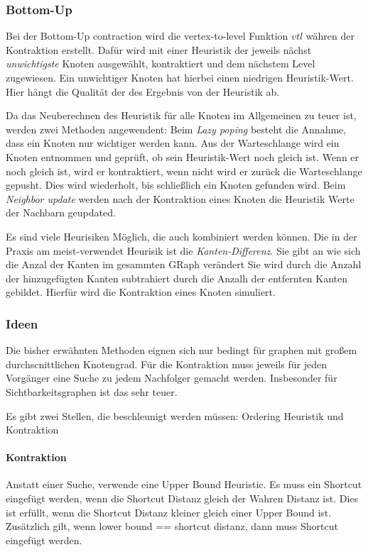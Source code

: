 \subsubsection{Bottom-Up}

Bei der Bottom-Up contraction wird die vertex-to-level Funktion ${vtl}$ währen der Kontraktion erstellt.
Dafür wird mit einer Heuristik der jeweils nächst \emph{unwichtigste} Knoten ausgewählt, kontraktiert und dem nächstem Level zugewiesen.
Ein unwichtiger Knoten hat hierbei einen niedrigen Heuristik-Wert.
Hier hängt die Qualität der des Ergebnis von der Heuristik ab.

Da das Neuberechnen des Heuristik für alle Knoten im Allgemeinen zu teuer ist, werden zwei Methoden angewendent:
Beim \emph{Lazy poping} besteht die Annahme, dass ein Knoten nur wichtiger werden kann.
Aus der Warteschlange wird ein Knoten entnommen und geprüft, ob sein Heuristik-Wert noch gleich ist.
Wenn er noch gleich ist, wird er kontraktiert, wenn nicht wird er zurück die Warteschlange gepusht.
Dies wird wiederholt, bis schließlich ein Knoten gefunden wird.
Beim \emph{Neighbor update} werden nach der Kontraktion eines Knoten die Heuristik Werte der Nachbarn geupdated.

Es sind viele Heurisiken Möglich, die auch kombiniert werden können.
Die in der Praxis am meist-verwendet Heurisik ist die \emph{Kanten-Differenz}.
Sie gibt an wie sich die Anzal der Kanten im gesammten GRaph verändert
Sie wird durch die Anzahl der hinzugefügten Kanten subtrahiert durch die Anzalh der entfernten Kanten gebildet.
Hierfür wird die Kontraktion eines Knoten simuliert.

\subsubsection{Ideen}

Die bisher erwähnten Methoden eignen sich nur bedingt für graphen mit großem durchscnittlichen Knotengrad.
Für die Kontraktion muss jeweils für jeden Vorgänger eine Suche zu jedem Nachfolger gemacht werden.
Insbesonder für Sichtbarkeitsgraphen ist das sehr teuer.

Es gibt zwei Stellen, die beschleunigt werden müssen:
Ordering Heuristik und Kontraktion

\paragraph{Kontraktion}
Anstatt einer Suche, verwende eine Upper Bound Heuristic.
Es muss ein Shortcut eingefügt werden, wenn die Shortcut Distanz gleich der Wahren Distanz ist.
Dies ist erfüllt, wenn die Shortcut Distanz kleiner gleich einer Upper Bound ist.
Zusätzlich gilt, wenn lower bound == shortcut distanz, dann muss Shortcut eingefügt werden.

